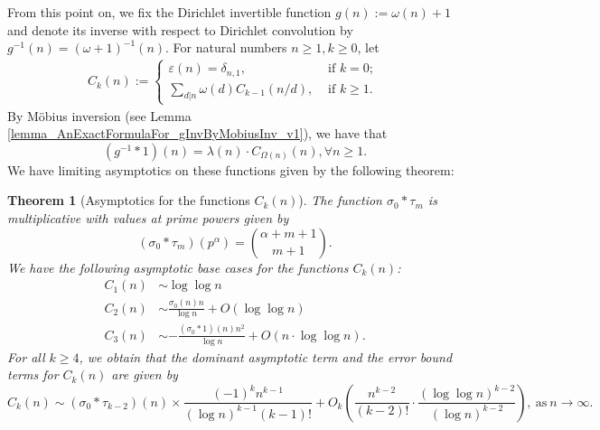 \documentclass[11pt,reqno,a4letter]{article}
\numberwithin{figure}{section}
\numberwithin{table}{section}
\theoremstyle{plain}
\newtheorem{theorem}{Theorem}
\numberwithin{theorem}{section}
\theoremstyle{definition}
\begin{document}
From this point on, we fix the Dirichlet invertible function $g(n) := \omega(n) + 1$ and denote its 
inverse with respect to Dirichlet convolution by $g^{-1}(n) = (\omega+1)^{-1}(n)$. 
For natural numbers $n \geq 1, k \geq 0$, let 
\begin{align*} 
C_k(n) := \begin{cases} 
     \varepsilon(n) = \delta_{n,1}, & \text{ if $k = 0$; } \\ 
     \sum\limits_{d|n} \omega(d) C_{k-1}(n/d), & \text{ if $k \geq 1$. } 
     \end{cases} 
\end{align*} 
By M\"obius inversion (see Lemma \ref{lemma_AnExactFormulaFor_gInvByMobiusInv_v1}), 
we have that 
\begin{equation} 
\label{eqn_AnExactFormulaFor_gInvByMobiusInv_v1} 
(g^{-1} \ast 1)(n) = \lambda(n) \cdot C_{\Omega(n)}(n), \forall n \geq 1. 
\end{equation} 
We have limiting asymptotics on these functions given by the following theorem: 

\begin{theorem}[Asymptotics for the functions $C_k(n)$] 
\label{theorem_Ckn_GeneralAsymptoticsForms} 
The function $\sigma_0 \ast \tau_m$ is multiplicative with values at prime powers 
given by 
\[
(\sigma_0 \ast \tau_m)(p^{\alpha}) = \binom{\alpha+m+1}{m+1}. 
\]
We have the following asymptotic base cases for the functions $C_k(n)$: 
\begin{align*} 
C_1(n) & \sim \log\log n \\ 
C_2(n) & \sim \frac{\sigma_0(n) n}{\log n} + O(\log\log n) \\ 
C_3(n) & \sim -\frac{(\sigma_0 \ast 1)(n) n^2}{\log n} + 
     O\left(n \cdot \log\log n\right). 
\end{align*} 
For all $k \geq 4$, we obtain that the dominant asymptotic term and the error bound terms for 
$C_k(n)$ are given by 
\[
C_k(n) \sim (\sigma_0 \ast \tau_{k-2})(n) \times \frac{(-1)^{k} n^{k-1}}{(\log n)^{k-1} (k-1)!} + 
     O_k\left(\frac{n^{k-2}}{(k-2)!} \cdot \frac{(\log\log n)^{k-2}}{(\log n)^{k-2}}\right), 
     \mathrm{\ as\ }n \rightarrow \infty. 
\]
\end{theorem} 
\end{document}
